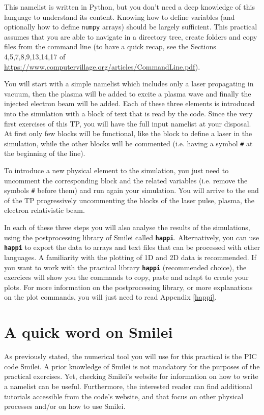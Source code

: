\documentclass[a4paper,12pt]{extarticle}
\newcommand{\smilei}{{\sc Smilei}\xspace}
\newcommand{\commandline}[1]{\texttt{\textbf{#1}}}
\begin{document}
This namelist is written in Python, but you don't need a deep knowledge of this language to understand its content. Knowing how to define variables (and optionally how to define \texttt{numpy} arrays) should be largely sufficient. This practical assumes that you are able to navigate in a directory tree, create folders and copy files from the command line (to have a quick recap, see the Sections 4,5,7,8,9,13,14,17 of \url{https://www.computervillage.org/articles/CommandLine.pdf}). 

You will start with a simple namelist which includes only a laser propagating in vacuum, then the plasma will be added to excite a plasma wave and finally the injected electron beam will be added. Each of these three elements is introduced into the simulation with a block of text that is read by the code. Since the very first exercises of this TP, you will have the full input namelist at your disposal. At first only few blocks will be functional, like the block to define a laser in the simulation, while the other blocks will be commented (i.e. having a symbol \texttt{\#} at the beginning of the line).

To introduce a new physical element to the simulation, you just need to uncomment the corresponding block and the related variables (i.e. remove the symbols \texttt{\#} before them) and run  again your simulation. You will arrive to the end of the TP progressively uncommenting the blocks of the laser pulse, plasma, the electron relativistic beam.

In each of these three steps you will also analyse the results of the simulations, using the postprocessing library of \smilei called \commandline{happi}. Alternatively, you can use \commandline{happi} to export the data to arrays and text files that can be processed with other languages.  A familiarity with the plotting of 1D and 2D data is recommended. If you want to work with the practical library \commandline{happi} (recommended choice),  the exercices will show you the commands to copy, paste and adapt to create your plots. For more information on the postprocessing library, or more explanations on the plot commands, you will just need to read Appendix \ref{happi}.

\section*{A quick word on \smilei} %

As previously stated, the numerical tool you will use for this practical is the PIC code \smilei. A prior knowledge of \smilei is not mandatory for the purposes of the practical exercises.
Yet, checking \smilei's website for information on how to write a namelist can be useful. 
Furthermore, the interested reader can find additional tutorials accessible from the code's website, and that focus on other physical processes and/or on how to use \smilei.
\end{document}
